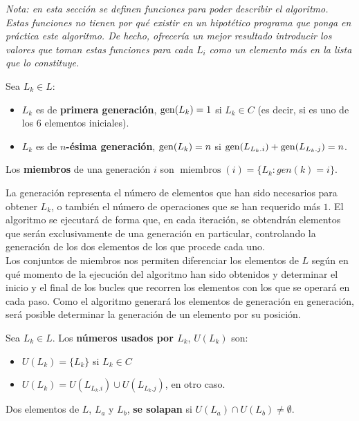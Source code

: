 \emph{Nota: en esta sección se definen funciones para poder describir el algoritmo.
Estas funciones no tienen por qué existir en un hipotético programa que ponga en
práctica este algoritmo. De hecho, ofrecería un mejor resultado introducir los
valores que toman estas funciones para cada $L_i$ como un elemento más en la
lista que lo constituye.}

\begin{definition}
  Sea $L_k \in L$:
  \begin{itemize}
    \item $L_k$ es de \textbf{primera generación}, $\operatorname{gen}(L_k) = 1$ si $L_k \in C$
    (es decir, si es uno de los 6 elementos iniciales).
    \item $L_k$ es de \textbf{$n$-ésima generación}, $\operatorname{gen}(L_k) = n$ si $\operatorname{gen}(L_{L_k.i}) + \operatorname{gen}(L_{L_k.j}) = n$.
  \end{itemize}
  Los \textbf{miembros} de una generación $i$ son $\operatorname{miembros}(i) = \{L_k : gen(k) = i\}$.
\end{definition}

La generación representa el número de elementos que han sido necesarios
para obtener $L_k$, o también el número de operaciones que se han
requerido más $1$.
El algoritmo se ejecutará de forma que, en cada iteración, se obtendrán
elementos que serán exclusivamente de una generación en particular,
controlando la generación de los dos elementos de los que procede cada uno.\\

Los conjuntos de miembros nos permiten diferenciar los elementos de $L$ según en
qué momento de la ejecución del algoritmo han sido obtenidos y determinar el
inicio y el final de los bucles que recorren los elementos con los que se operará
en cada paso. Como el algoritmo generará los elementos de generación en generación,
será posible determinar la generación de un elemento por su posición.

\begin{definition}
  Sea $L_k \in L$. Los \textbf{números usados por $L_k$}, $U(L_k)$ son:
  \begin{itemize}
    \item $U(L_k) = \{ L_k\}$ si $L_k \in C$
    \item $U(L_k) = U(L_{L_k.i}) \cup U(L_{L_k.j})$, en otro caso.
  \end{itemize}
  Dos elementos de $L$, $L_a$ y $L_b$, \textbf{se solapan} si
  $U(L_a) \cap  U(L_b) \ne \emptyset$.
\end{definition}

